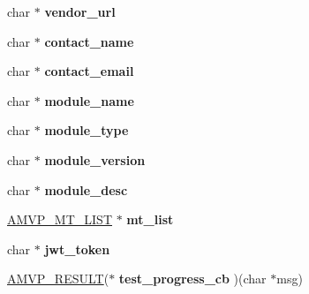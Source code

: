 \begin{DoxyCompactItemize}
\item 
\hypertarget{structamvp__ctx__t_afde01db975dae06068a2d6868d0cd1e2}{char $\ast$ {\bfseries vendor\-\_\-url}}\label{structamvp__ctx__t_afde01db975dae06068a2d6868d0cd1e2}

\item 
\hypertarget{structamvp__ctx__t_a89978158c65fae028d1e41f30fd0a7ba}{char $\ast$ {\bfseries contact\-\_\-name}}\label{structamvp__ctx__t_a89978158c65fae028d1e41f30fd0a7ba}

\item 
\hypertarget{structamvp__ctx__t_a9d5fb8040491323314f1eb9ec4069b0e}{char $\ast$ {\bfseries contact\-\_\-email}}\label{structamvp__ctx__t_a9d5fb8040491323314f1eb9ec4069b0e}

\item 
\hypertarget{structamvp__ctx__t_a1c1c2da949e825136916da672dfa42fe}{char $\ast$ {\bfseries module\-\_\-name}}\label{structamvp__ctx__t_a1c1c2da949e825136916da672dfa42fe}

\item 
\hypertarget{structamvp__ctx__t_a4f7d702992eb9ded52761724ab7fb87d}{char $\ast$ {\bfseries module\-\_\-type}}\label{structamvp__ctx__t_a4f7d702992eb9ded52761724ab7fb87d}

\item 
\hypertarget{structamvp__ctx__t_abd6b58ba1aafd131e454a7bce4f9c0d8}{char $\ast$ {\bfseries module\-\_\-version}}\label{structamvp__ctx__t_abd6b58ba1aafd131e454a7bce4f9c0d8}

\item 
\hypertarget{structamvp__ctx__t_a5275df9705fb1be0e46c0f4ed6e83c90}{char $\ast$ {\bfseries module\-\_\-desc}}\label{structamvp__ctx__t_a5275df9705fb1be0e46c0f4ed6e83c90}

\item 
\hypertarget{structamvp__ctx__t_a4e6ce5860f4b2c2a5e7c05538e31a78b}{\hyperlink{structamvp__mt__list__t}{A\-M\-V\-P\-\_\-\-M\-T\-\_\-\-L\-I\-S\-T} $\ast$ {\bfseries mt\-\_\-list}}\label{structamvp__ctx__t_a4e6ce5860f4b2c2a5e7c05538e31a78b}

\item 
\hypertarget{structamvp__ctx__t_a90204f1accff0e670f36230696aaecf2}{char $\ast$ {\bfseries jwt\-\_\-token}}\label{structamvp__ctx__t_a90204f1accff0e670f36230696aaecf2}

\item 
\hypertarget{structamvp__ctx__t_af9ab2975dfa1b1d286057e7072fb71d9}{\hyperlink{structAMVP__RESULT}{A\-M\-V\-P\-\_\-\-R\-E\-S\-U\-L\-T}($\ast$ {\bfseries test\-\_\-progress\-\_\-cb} )(char $\ast$msg)}\label{structamvp__ctx__t_af9ab2975dfa1b1d286057e7072fb71d9}


\end{DoxyCompactItemize}
